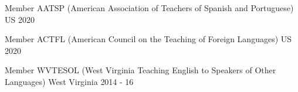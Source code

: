 


\begin{cvhonors}


\cvhonor
{Member} %
{AATSP (American Association of Teachers of Spanish and Portuguese)} %
{US} %
{2020} %


\cvhonor
{Member} %
{ACTFL (American Council on the Teaching of Foreign Languages)} %
{US} %
{2020} %


\cvhonor
{Member} %
{WVTESOL (West Virginia Teaching English to Speakers of Other Languages)} %
{West Virginia} %
{2014 - 16} %


\end{cvhonors}